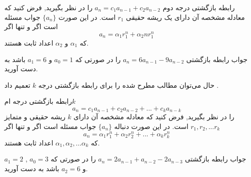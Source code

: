 \begin{THEOREM}
    \p
    رابطه‌ بازگشتی درجه دوم
    $a_n=c_1 a_{n-1}+c_2 a_{n-2}$
    را در نظر بگیرید, فرض کنید که معادله مشخصه آن دارای یک ریشه حقیقی 
    $r_1$
    است.
    در این صورت 
    $\{a_n\}$
    جواب مسئله است اگر و تنها اگر
    \[a_n=\alpha_1 r_1^n+\alpha_2 nr_1^n\]
    که
    $\alpha_1$
    و
    $\alpha_2$
    اعداد ثابت هستند.

\end{THEOREM}
\begin{PROBLEM}
    \p
    جواب رابطه‌ بازگشتی 
    $a_n=6a_{n-1}-9a_{n-2}$
    را در صورتی که
    $a_0=1$
    و
    $a_1=6$
    باشد به دست آورید.
\end{PROBLEM}
\p
حال می‌توان مطالب مطرح شده را برای رابطه‌ بازگشتی درجه
$k$
تعمیم داد
.
\begin{THEOREM}
    \p
    رابطه‌ بازگشتی درجه 
    ام$k$
    \[a_n=c_{1}a_{n-1}+c_{2}a_{n-2}+...+c_{k}a_{n-k}\]
    را در نظر بگیرید, فرض کنید که معادله مشخصه آن دارای 
    $k$
    ریشه حقیقی و متمایز 
    $r_1, r_2, ...r_k $
    است.
    در این صورت دنباله 
    $\{a_n\}$
    جواب مسئله است اگر و تنها اگر
    \[a_n=\alpha_1 r_1^n+\alpha_2 r_2^n+...+\alpha_k r_k^n\]
    که
    $\alpha_1,\alpha_2,...\alpha_k$
    اعداد ثابت هستند.

\end{THEOREM}

\begin{PROBLEM}
    \p
    جواب رابطه‌ بازگشتی 
    $a_n=2a_{n-1}+a_{n-2}-2a_{n-3}$
    را در صورتی که
    $a_0=3$
    ,
    $a_1=2$
    و
    $a_2=6$
    باشد به دست آورید.
\end{PROBLEM}

